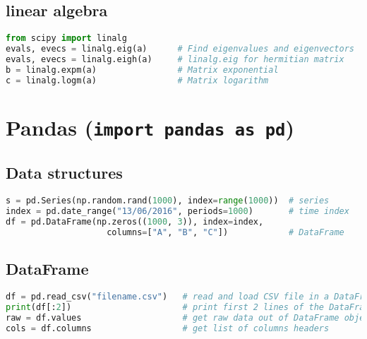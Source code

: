 \subsection{linear algebra}\label{linear-algebra}

\begin{lstlisting}[language=Python]
from scipy import linalg
evals, evecs = linalg.eig(a)      # Find eigenvalues and eigenvectors
evals, evecs = linalg.eigh(a)     # linalg.eig for hermitian matrix
b = linalg.expm(a)                # Matrix exponential
c = linalg.logm(a)                # Matrix logarithm
\end{lstlisting}

\section{\texorpdfstring{Pandas
(\texttt{import\ pandas\ as\ pd})}{Pandas (import pandas as pd)}}\label{pandas-import-pandas-as-pd}

\subsection{Data structures}\label{data-structures}

\begin{lstlisting}[language=Python]
s = pd.Series(np.random.rand(1000), index=range(1000))  # series
index = pd.date_range("13/06/2016", periods=1000)       # time index
df = pd.DataFrame(np.zeros((1000, 3)), index=index,
                    columns=["A", "B", "C"])            # DataFrame
\end{lstlisting}

\subsection{DataFrame}\label{dataframe}

\begin{lstlisting}[language=Python]
df = pd.read_csv("filename.csv")   # read and load CSV file in a DataFrame
print(df[:2])                      # print first 2 lines of the DataFrame
raw = df.values                    # get raw data out of DataFrame object
cols = df.columns                  # get list of columns headers
\end{lstlisting}
